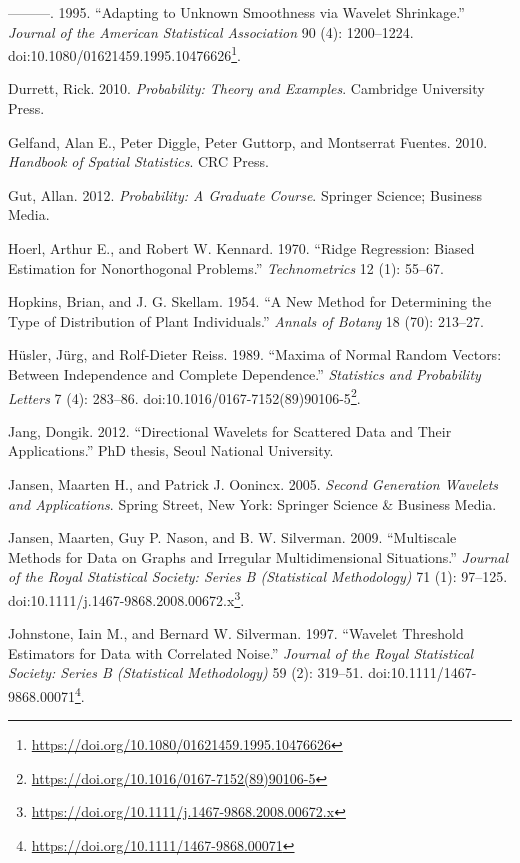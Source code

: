 \documentclass[b5paper,]{book}
\let\rmarkdownfootnote\footnote%
\def\footnote{\protect\rmarkdownfootnote}
\renewcommand{\href}[2]{#2\footnote{\url{#1}}}
\theoremstyle{definition}
\theoremstyle{definition}
\theoremstyle{definition}
\theoremstyle{remark}
\begin{document}
\hypertarget{ref-Donoho1995}{}
---------. 1995. ``Adapting to Unknown Smoothness via Wavelet
Shrinkage.'' \emph{Journal of the American Statistical Association} 90
(4): 1200--1224.
doi:\href{https://doi.org/10.1080/01621459.1995.10476626}{10.1080/01621459.1995.10476626}.

\hypertarget{ref-Durrett2010}{}
Durrett, Rick. 2010. \emph{Probability: Theory and Examples}. Cambridge
University Press.

\hypertarget{ref-Gelfand2010}{}
Gelfand, Alan E., Peter Diggle, Peter Guttorp, and Montserrat Fuentes.
2010. \emph{Handbook of Spatial Statistics}. CRC Press.

\hypertarget{ref-Gut2012}{}
Gut, Allan. 2012. \emph{Probability: A Graduate Course}. Springer
Science; Business Media.

\hypertarget{ref-Hoerl1970}{}
Hoerl, Arthur E., and Robert W. Kennard. 1970. ``Ridge Regression:
Biased Estimation for Nonorthogonal Problems.'' \emph{Technometrics} 12
(1): 55--67.

\hypertarget{ref-Hopkins1954}{}
Hopkins, Brian, and J. G. Skellam. 1954. ``A New Method for Determining
the Type of Distribution of Plant Individuals.'' \emph{Annals of Botany}
18 (70): 213--27.

\hypertarget{ref-Husler1989}{}
Hüsler, Jürg, and Rolf-Dieter Reiss. 1989. ``Maxima of Normal Random
Vectors: Between Independence and Complete Dependence.''
\emph{Statistics and Probability Letters} 7 (4): 283--86.
doi:\href{https://doi.org/10.1016/0167-7152(89)90106-5}{10.1016/0167-7152(89)90106-5}.

\hypertarget{ref-Jang2012}{}
Jang, Dongik. 2012. ``Directional Wavelets for Scattered Data and Their
Applications.'' PhD thesis, Seoul National University.

\hypertarget{ref-Jansen2005}{}
Jansen, Maarten H., and Patrick J. Oonincx. 2005. \emph{Second
Generation Wavelets and Applications}. Spring Street, New York: Springer
Science \& Business Media.

\hypertarget{ref-Jansen2008}{}
Jansen, Maarten, Guy P. Nason, and B. W. Silverman. 2009. ``Multiscale
Methods for Data on Graphs and Irregular Multidimensional Situations.''
\emph{Journal of the Royal Statistical Society: Series B (Statistical
Methodology)} 71 (1): 97--125.
doi:\href{https://doi.org/10.1111/j.1467-9868.2008.00672.x}{10.1111/j.1467-9868.2008.00672.x}.

\hypertarget{ref-Johnstone1997}{}
Johnstone, Iain M., and Bernard W. Silverman. 1997. ``Wavelet Threshold
Estimators for Data with Correlated Noise.'' \emph{Journal of the Royal
Statistical Society: Series B (Statistical Methodology)} 59 (2):
319--51.
doi:\href{https://doi.org/10.1111/1467-9868.00071}{10.1111/1467-9868.00071}.
\end{document}
